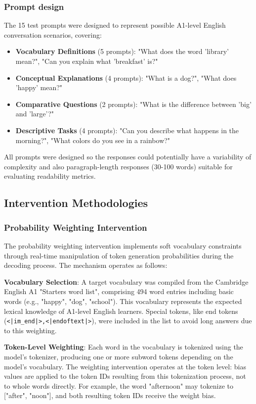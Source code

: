 \documentclass[10pt, a4paper]{article}
\begin{document}
\subsubsection{Prompt design}
The 15 test prompts were designed to represent possible A1-level English conversation scenarios, covering:
\begin{itemize}
    \item \textbf{Vocabulary Definitions} (5 prompts): "What does the word 'library' mean?", "Can you explain what 'breakfast' is?"
    \item \textbf{Conceptual Explanations} (4 prompts): "What is a dog?", "What does 'happy' mean?"
    \item \textbf{Comparative Questions} (2 prompts): "What is the difference between 'big' and 'large'?"
    \item \textbf{Descriptive Tasks} (4 prompts): "Can you describe what happens in the morning?", "What colors do you see in a rainbow?"
\end{itemize}

All prompts were designed so the responses could potentially have a variability of complexity and also paragraph-length responses (30-100 words) suitable for evaluating readability metrics. 

\subsection{Intervention Methodologies}
\subsubsection{Probability Weighting Intervention}
The probability weighting intervention implements soft vocabulary constraints through real-time manipulation of token generation probabilities during the decoding process. The mechanism operates as follows:

\textbf{Vocabulary Selection}: A target vocabulary was compiled from the Cambridge English A1 "Starters word list", comprising 494 word entries including basic words (e.g., "happy", "dog", "school"). This vocabulary represents the expected lexical knowledge of A1-level English learners. Special tokens, like end tokens (\texttt{<|im\_end|>,<|endoftext|>}), were included in the list to avoid long answers due to this weighting.

\textbf{Token-Level Weighting}: Each word in the vocabulary is tokenized using the model's tokenizer, producing one or more subword tokens depending on the model's vocabulary. The weighting intervention operates at the token level: bias values are applied to the token IDs resulting from this tokenization process, not to whole words directly. For example, the word "afternoon" may tokenize to ["after", "noon"], and both resulting token IDs receive the weight bias.
\end{document}
